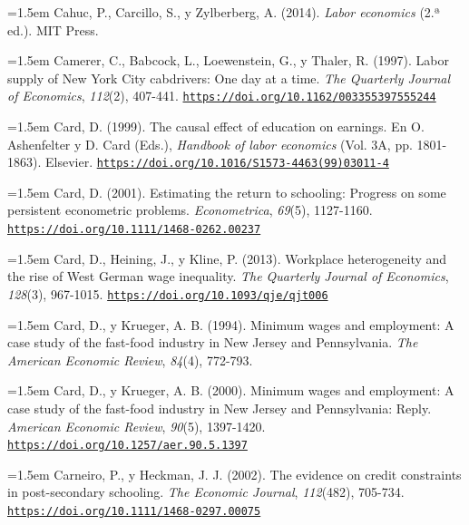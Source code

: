 \documentclass[10pt,a4paper]{article}
\begin{document}
\noindent\hangindent=1.5em Cahuc, P., Carcillo, S., y Zylberberg, A. (2014). \textit{Labor economics} (2.ª ed.). MIT Press.

\noindent\hangindent=1.5em Camerer, C., Babcock, L., Loewenstein, G., y Thaler, R. (1997). Labor supply of New York City cabdrivers: One day at a time. \textit{The Quarterly Journal of Economics}, \textit{112}(2), 407-441. \href{https://doi.org/10.1162/003355397555244}{\nolinkurl{https://doi.org/10.1162/003355397555244}}

\noindent\hangindent=1.5em Card, D. (1999). The causal effect of education on earnings. En O. Ashenfelter y D. Card (Eds.), \textit{Handbook of labor economics} (Vol. 3A, pp. 1801-1863). Elsevier. \href{https://doi.org/10.1016/S1573-4463(99)03011-4}{\nolinkurl{https://doi.org/10.1016/S1573-4463(99)03011-4}}

\noindent\hangindent=1.5em Card, D. (2001). Estimating the return to schooling: Progress on some persistent econometric problems. \textit{Econometrica}, \textit{69}(5), 1127-1160. \href{https://doi.org/10.1111/1468-0262.00237}{\nolinkurl{https://doi.org/10.1111/1468-0262.00237}}

\noindent\hangindent=1.5em Card, D., Heining, J., y Kline, P. (2013). Workplace heterogeneity and the rise of West German wage inequality. \textit{The Quarterly Journal of Economics}, \textit{128}(3), 967-1015. \href{https://doi.org/10.1093/qje/qjt006}{\nolinkurl{https://doi.org/10.1093/qje/qjt006}}

\noindent\hangindent=1.5em Card, D., y Krueger, A. B. (1994). Minimum wages and employment: A case study of the fast-food industry in New Jersey and Pennsylvania. \textit{The American Economic Review}, \textit{84}(4), 772-793.

\noindent\hangindent=1.5em Card, D., y Krueger, A. B. (2000). Minimum wages and employment: A case study of the fast-food industry in New Jersey and Pennsylvania: Reply. \textit{American Economic Review}, \textit{90}(5), 1397-1420. \href{https://doi.org/10.1257/aer.90.5.1397}{\nolinkurl{https://doi.org/10.1257/aer.90.5.1397}}

\noindent\hangindent=1.5em Carneiro, P., y Heckman, J. J. (2002). The evidence on credit constraints in post-secondary schooling. \textit{The Economic Journal}, \textit{112}(482), 705-734. \href{https://doi.org/10.1111/1468-0297.00075}{\nolinkurl{https://doi.org/10.1111/1468-0297.00075}}
\end{document}
